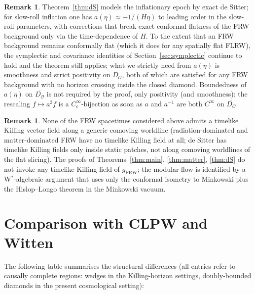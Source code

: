 \documentclass[11pt]{article}
\theoremstyle{definition}
\newtheorem{remark}[theorem]{Remark}
\newcommand{\OO}{\mathcal{O}}
\newcommand{\FRW}{\mathrm{FRW}}
\begin{document}
\begin{remark}\label{rem:dS-scope}
Theorem~\ref{thm:dS} models the inflationary epoch by exact de Sitter; for slow-roll inflation one has $a(\eta) \approx -1/(H\eta)$ to leading order in the slow-roll parameters, with corrections that break exact conformal flatness of the FRW background only via the time-dependence of $H$. To the extent that an FRW background remains conformally flat (which it does for any spatially flat FLRW), the symplectic and covariance identities of Section~\ref{sec:symplectic} continue to hold and the theorem still applies; what we strictly need from $a(\eta)$ is smoothness and strict positivity on $\overline{D_\OO}$, both of which are satisfied for any FRW background with no horizon crossing inside the closed diamond. Boundedness of $a(\eta)$ on $\overline{D_\OO}$ is not required by the proof, only positivity (and smoothness): the rescaling $f\mapsto a^3 f$ is a $C_c^\infty$-bijection as soon as $a$ and $a^{-1}$ are both $C^\infty$ on $\overline{D_\OO}$.
\end{remark}

\begin{remark}\label{rem:no-killing}
None of the FRW spacetimes considered above admits a timelike Killing vector field along a generic comoving worldline (radiation-dominated and matter-dominated FRW have no timelike Killing field at all; de Sitter has timelike Killing fields only inside static patches, not along comoving worldlines of the flat slicing). The proofs of Theorems~\ref{thm:main}, \ref{thm:matter}, \ref{thm:dS} do not invoke any timelike Killing field of $g_\FRW$; the modular flow is identified by a W$^*$-algebraic argument that uses only the conformal isometry to Minkowski plus the Hislop--Longo theorem in the Minkowski vacuum.
\end{remark}

\section{Comparison with CLPW and Witten}\label{sec:compare}

The following table summarises the structural differences (all entries refer to causally complete regions: wedges in the Killing-horizon settings, doubly-bounded diamonds in the present cosmological setting):
\end{document}

